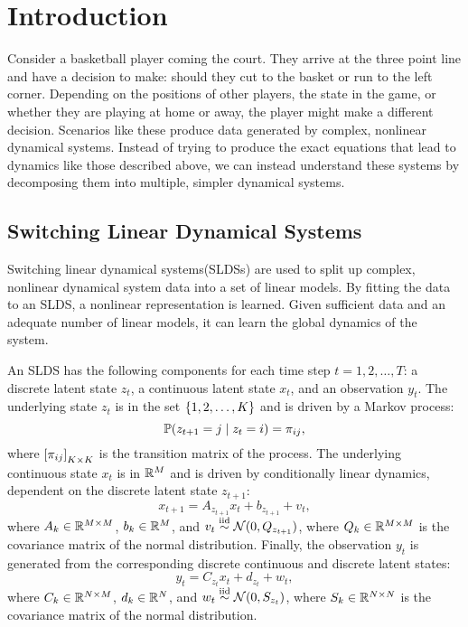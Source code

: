 
\section{Introduction}

Consider a basketball player coming the court. They arrive at the three point line and have a decision to make: should they cut to the basket or run to the left corner. Depending on the positions of other players, the state in the game, or whether they are playing at home or away, the player might make a different decision. Scenarios like these produce data generated by complex, nonlinear dynamical systems. Instead of trying to produce the exact equations that lead to dynamics like those described above, we can instead understand these systems by decomposing them into multiple, simpler dynamical systems.

\subsection{Switching Linear Dynamical Systems}

Switching linear dynamical systems(SLDSs) are used to split up complex, nonlinear dynamical system data into a set of linear models. By fitting the data to an SLDS, a nonlinear representation is learned. Given sufficient data and an adequate number of linear models, it can learn the global dynamics of the system.

An SLDS has the following components for each time step $t = 1,2, \dots, T$: a discrete latent state $z_t$, a continuous latent state $x_t$, and an observation $y_t$. The underlying state $z_t$ is in the set ${\left\{1,2,\dots,K\right\}}$ and is driven by a Markov process:
\[\mathbb{P}(z_{t+1} = j \mid z_t = i) = \pi_{ij}, \]
where ${\left[\pi_{ij}\right]}_{K\times K}$ is the transition matrix of the process. The underlying continuous state $x_t$ is in $\mathbb{R}^M$ and is driven by conditionally linear dynamics, dependent on the discrete latent state $z_{t+1}$:
\[x_{t+1} = A_{z_{t+1}} x_t + b_{z_{t+1}} + v_t, \]
where $A_k\in\mathbb{R}^{M\times M}$, $b_k\in \mathbb{R}^M$, and $v_t \overset{\mathrm{iid}}{\sim} \mathcal{N}(0,Q_{z_{t+1}})$, where $Q_k\in\mathbb{R}^{M\times M}$ is the covariance matrix of the normal distribution. Finally, the observation $y_t$ is generated from the corresponding discrete continuous and discrete latent states:
\[y_t = C_{z_{t}} x_t + d_{z_{t}} + w_t,\]
where $C_k\in\mathbb{R}^{N\times M}$, $d_k\in \mathbb{R}^N$, and $w_t \overset{\mathrm{iid}}{\sim} \mathcal{N}(0,S_{z_{t}})$, where $S_k\in\mathbb{R}^{N\times N}$ is the covariance matrix of the normal distribution.

